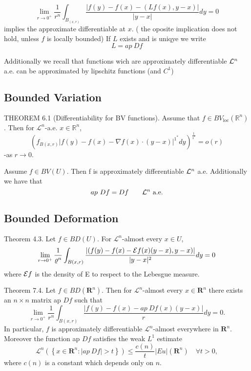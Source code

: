 $$\lim _{r \rightarrow 0^{+}} \frac{1}{r^n} \int_{B_(x,r)} \frac{|f(y)-f(x)-(L f(x), y-x)|}{|y-x|}dy=0$$ 
implies the approximate differentiable at $x$. ( the oposite implication does not hold, unless $f$ is locally bounded)
If $L$ exists and is uniqye we write $$L= ap\ Df$$

Additionally we recall that functions wich are approximately differentiable ${\mathcal L}^n$ a.e. can be approximated by lipschitz functions (and $C^1$)
\subsection{Bounded Variation}
\begin{theorem}
THEOREM 6.1 (Differentiability for BV functions). Assume that $f \in B V_{\mathrm{loc}}\left(\mathbb{R}^n\right)$. Then for $\mathcal{L}^n$-a.e. $x \in \mathbb{R}^n$,
$$
\left(f_{B(x, r)}|f(y)-f(x)-\nabla f(x) \cdot(y-x)|^{1^*} d y\right)^{\frac{1}{1^*}}=o(r)
$$
-as $r \rightarrow 0$.
\end{theorem}
\begin{theorem}
Assume $f\in BV(U)$. Then f is approximately differentiable ${\mathcal L}^n$ a.e. Additionally we have that
$$ap\ Df = Df\qquad {\mathcal L}^n\text{ a.e.}$$
\end{theorem}
\subsection{Bounded Deformation}
\begin{theorem}
Theorem 4.3. Let $f \in B D(U)$. For $\mathscr{L}^n$-almost every $x \in U$,
$$
\lim _{r \rightarrow 0^{+}} \frac{1}{\varrho^n} \int_{B(x,r)} \frac{|(f(y)-f(x)-{\mathcal E} f(x)(y-x), y-x)|}{|y-x|^2} d y=0
$$
where ${\mathcal E} f$ is the density of E to respect to the Lebesgue measure.
\end{theorem}

\begin{theorem}
Theorem 7.4. Let $f \in B D\left(\mathbf{R}^n\right)$. Then for $\mathscr{L}^n$-almost every $x \in \mathbf{R}^n$ there exists an $n \times n$ matrix ap $Df$ such that
$$
\lim _{r \rightarrow 0^{+}} \frac{1}{r^n} \int_{B(x,r)} \frac{|f(y)-f(x)-ap\ Df (x)(y-x)|}{r} d y=0 .
$$
In particular, $f$ is approximately differentiable $\mathscr{L}^n$-almost everywhere in $\mathbf{R}^n$. Moreover the function ap $Df$ satisfies the weak $L^1$ estimate
$$
\mathscr{L}^n\left(\left\{x \in \mathbf{R}^n:|ap\  Df|>t\right\}\right) \leq \frac{c(n)}{t}|E u|\left(\mathbf{R}^n\right) \quad \forall t>0,
$$
where $c(n)$ is a constant which depends only on $n$.
\end{theorem}


